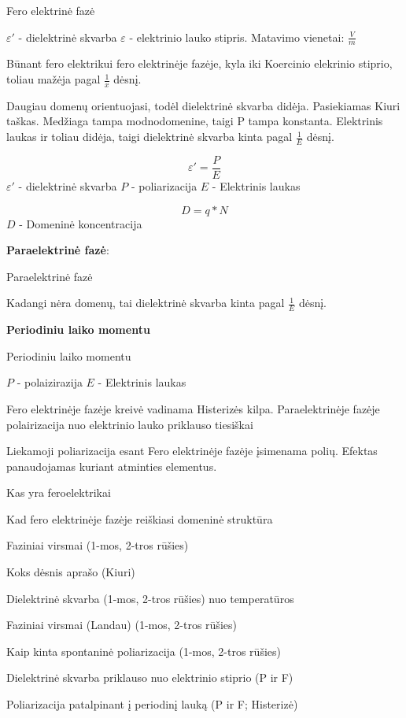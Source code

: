 {Fero elektrinė fazė}

$\varepsilon'$ - dielektrinė skvarba
$\varepsilon$ - elektrinio lauko stipris. Matavimo vienetai: $\frac{V}{m}$

Būnant fero elektrikui fero elektrinėje fazėje, kyla iki Koercinio elekrinio stiprio,
toliau mažėja pagal $\frac{1}{x}$ dėsnį.

Daugiau domenų orientuojasi, todėl dielektrinė skvarba didėja.
Pasiekiamas Kiuri taškas. Medžiaga tampa modnodomenine, taigi P tampa konstanta.
Elektrinis laukas ir toliau didėja, taigi dielektrinė skvarba kinta pagal $\frac{1}{E}$
dėsnį.

\begin{equation*}
  \varepsilon' = \frac{P}{E} 
\end{equation*}
$\varepsilon'$ - dielektrinė skvarba
$P$ - poliarizacija
$E$ - Elektrinis laukas

\begin{equation*}
  D = q * N
\end{equation*}
$D$ - Domeninė koncentracija

\textbf{Paraelektrinė fazė}:

{Paraelektrinė fazė}

Kadangi nėra domenų, tai dielektrinė skvarba kinta pagal $\frac{1}{E}$
dėsnį.

\textbf{Periodiniu laiko momentu}

{Periodiniu laiko momentu}

$P$ - polaizirazija
$E$ - Elektrinis laukas

Fero elektrinėje fazėje kreivė vadinama Histerizės kilpa.
Paraelektrinėje fazėje polairizacija nuo elektrinio lauko priklauso tiesiškai

Liekamoji poliarizacija esant Fero elektrinėje fazėje įsimenama polių.
Efektas panaudojamas kuriant atminties elementus.

\begin{remember}
	\item Kas yra feroelektrikai
	\item Kad fero elektrinėje fazėje reiškiasi domeninė struktūra
	\item Faziniai virsmai (1-mos, 2-tros rūšies)
	\item Koks dėsnis aprašo (Kiuri)
	\item Dielektrinė skvarba (1-mos, 2-tros rūšies) nuo temperatūros
	\item Faziniai virsmai (Landau) (1-mos, 2-tros rūšies)
	\item Kaip kinta spontaninė poliarizacija (1-mos, 2-tros rūšies)
	\item Dielektrinė skvarba priklauso nuo elektrinio stiprio (P ir F)
	\item Poliarizacija patalpinant į periodinį lauką (P ir F; Histerizė)
\end{remember}

